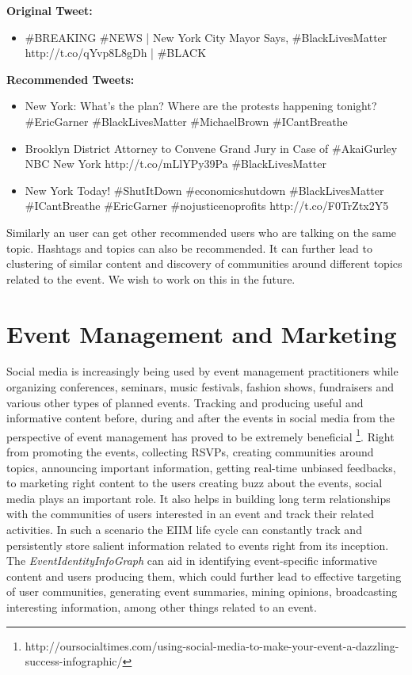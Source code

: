\textbf{Original Tweet:}

\begin{itemize}
\item \#BREAKING \#NEWS | New York City Mayor Says, \#BlackLivesMatter \\ http://t.co/qYvp8L8gDh | \#BLACK  
\end{itemize}

\textbf{Recommended Tweets:}

\begin{itemize}

\item New York: What's the plan? Where are the protests happening tonight? \#EricGarner \#BlackLivesMatter \#MichaelBrown \#ICantBreathe

\item Brooklyn District Attorney to Convene Grand Jury in Case of \#AkaiGurley NBC New York http://t.co/mLlYPy39Pa \#BlackLivesMatter

\item New York Today! \#ShutItDown \#economicshutdown \#BlackLivesMatter \#ICantBreathe \#EricGarner \#nojusticenoprofits http://t.co/F0TrZtx2Y5

\end{itemize}

Similarly an user can get other recommended users who are talking on the same topic. Hashtags and topics can also be recommended. It can further lead to clustering of similar content and discovery of communities around different topics related to the event. We wish to work on this in the future.



\section{Event Management and Marketing}
Social media is increasingly being used  by event management practitioners while organizing conferences, seminars, music festivals, fashion shows, fundraisers and various other types of planned events. Tracking and producing useful and informative content before, during and after the events in social media from the perspective of event management has proved to be extremely beneficial \footnote{http://oursocialtimes.com/using-social-media-to-make-your-event-a-dazzling-success-infographic/}. Right from promoting the events, collecting RSVPs, creating communities around topics, announcing important information, getting real-time unbiased feedbacks, to marketing right content to the users creating buzz about the events, social media plays an important role. It also helps in building long term relationships with the communities of users interested in an event and track their related activities. In such a scenario the EIIM life cycle can constantly track and persistently store salient information related to events right from its inception. The \textit{EventIdentityInfoGraph} can aid in identifying event-specific informative content and users producing them, which could further lead to effective targeting of user communities, generating event summaries, mining opinions, broadcasting interesting information, among other things related to an event.

